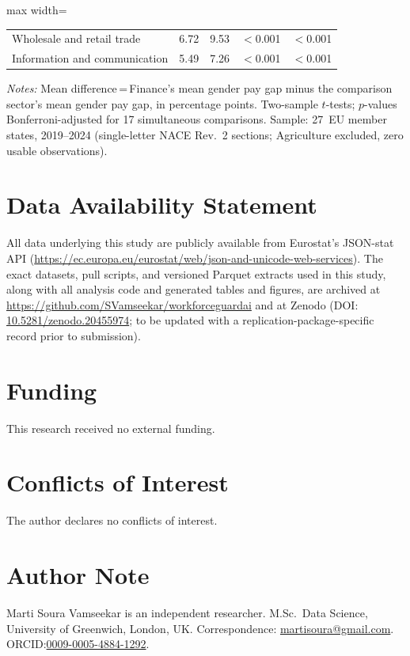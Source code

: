 \documentclass[12pt,a4paper]{article}
\begin{document}
\begin{table}[htbp]
\begin{threeparttable}
\begin{adjustbox}{max width=\textwidth}
\begin{tabular}{lrrrr}
Wholesale and retail trade                          &  6.72 &  9.53 & $<$0.001 & $<$0.001 \\
Information and communication                       &  5.49 &  7.26 & $<$0.001 & $<$0.001 \\
\bottomrule
\end{tabular}
\end{adjustbox}
\begin{tablenotes}
\footnotesize
\item \textit{Notes:} Mean difference\,=\,Finance's mean gender pay gap minus
  the comparison sector's mean gender pay gap, in percentage points.  Two-sample
  $t$-tests; $p$-values Bonferroni-adjusted for 17 simultaneous comparisons.
  Sample: 27~EU member states, 2019--2024 (single-letter NACE Rev.~2 sections;
  Agriculture excluded, zero usable observations).
\end{tablenotes}
\end{threeparttable}
\end{table}

\section*{Data Availability Statement}

All data underlying this study are publicly available from Eurostat's JSON-stat
API (\url{https://ec.europa.eu/eurostat/web/json-and-unicode-web-services}).  The
exact datasets, pull scripts, and versioned Parquet extracts used in this study,
along with all analysis code and generated tables and figures, are archived at
\url{https://github.com/SVamseekar/workforceguardai} and at Zenodo
(DOI:\,\href{https://doi.org/10.5281/zenodo.20455974}{10.5281/zenodo.20455974};
to be updated with a replication-package-specific record prior to submission).

\section*{Funding}

This research received no external funding.

\section*{Conflicts of Interest}

The author declares no conflicts of interest.

\section*{Author Note}

Marti Soura Vamseekar is an independent researcher.  M.Sc.\ Data Science,
University of Greenwich, London, UK\@.  Correspondence:
\href{mailto:martisoura@gmail.com}{martisoura@gmail.com}.
ORCID:\;\href{https://orcid.org/0009-0005-4884-1292}{0009-0005-4884-1292}.
\end{document}
